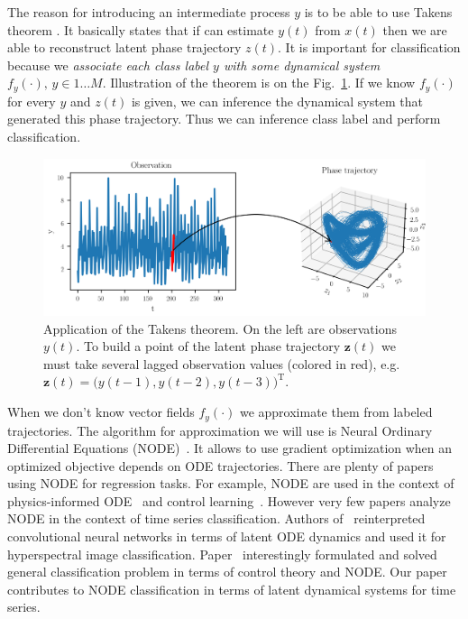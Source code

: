 \documentclass[referee, pdflatex, sn-mathphys-num]{sn-jnl}
\theoremstyle{definition}
\theoremstyle{plain}
\newcommand{\bz}{\ensuremath{\mathbf{z}}}
\begin{document}
		
		The reason for introducing an intermediate process $y$ is to be able to use Takens theorem \cite{takens2006detecting}. It basically states that if can estimate $y(t)$ from $x(t)$ then we are able to reconstruct latent phase trajectory $z(t)$.  It is important for classification because we \emph{associate each class label $y$ with some dynamical system} $f_y(\cdot), \, y \in 1 \ldots M$. Illustration of the theorem is on the Fig.~\ref{fig:takens}. If we know $f_y(\cdot)$ for every $y$ and $z(t)$ is given, we can inference the dynamical system that generated this phase trajectory. Thus we can inference class label and perform classification.
		
		\begin{figure}[h]
			\centering
			\includegraphics[width=\textwidth, keepaspectratio]{takens}
			
			\caption{Application of the Takens theorem. On the left are observations $y(t)$. To build a point of the latent phase trajectory $\bz(t)$ we must take several lagged observation values (colored in red), e.g. $\bz(t) = \big( y(t-1), y(t-2), y(t-3) \big)^{\text{T}}$.}\label{fig:takens}
		\end{figure}
		
		When we don't know vector fields $f_y(\cdot)$ we approximate them from labeled trajectories. The algorithm for approximation we will use is Neural Ordinary Differential Equations (NODE)~\cite{node}. It allows to use gradient optimization when an optimized objective depends on ODE trajectories. There are plenty of papers using NODE for regression tasks. For example, NODE are used in the context of physics-informed ODE~\cite{LAI2021116196, phys_informed_2} and control learning~\cite{NEURIPS2019_99a40143, node_rl}. However very few papers analyze NODE in the context of time series classification. Authors of~\cite{8892510} reinterpreted convolutional neural networks in terms of latent ODE dynamics and used it for hyperspectral image classification. Paper~\cite{node_control} interestingly formulated and solved general classification problem in terms of control theory and NODE. Our paper contributes to NODE classification in terms of latent dynamical systems for time series.
		
\end{document}
